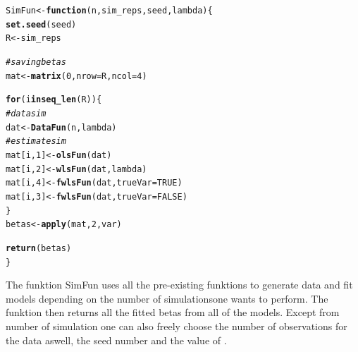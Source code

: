 \documentclass{article}\usepackage[]{graphicx}\usepackage[]{color}
\makeatletter
\newcommand{\hlnum}[1]{\textcolor[rgb]{0.686,0.059,0.569}{#1}}%
\newcommand{\hlcom}[1]{\textcolor[rgb]{0.678,0.584,0.686}{\textit{#1}}}%
\newcommand{\hlstd}[1]{\textcolor[rgb]{0.345,0.345,0.345}{#1}}%
\newcommand{\hlkwa}[1]{\textcolor[rgb]{0.161,0.373,0.58}{\textbf{#1}}}%
\newcommand{\hlkwb}[1]{\textcolor[rgb]{0.69,0.353,0.396}{#1}}%
\newcommand{\hlkwc}[1]{\textcolor[rgb]{0.333,0.667,0.333}{#1}}%
\newcommand{\hlkwd}[1]{\textcolor[rgb]{0.737,0.353,0.396}{\textbf{#1}}}%
\newenvironment{kframe}{%
 \def\at@end@of@kframe{}%
 \ifinner\ifhmode%
  \def\at@end@of@kframe{\end{minipage}}%
  \begin{minipage}{\columnwidth}%
 \fi\fi%
 \def\FrameCommand##1{\hskip\@totalleftmargin \hskip-\fboxsep
 \colorbox{shadecolor}{##1}\hskip-\fboxsep
     \hskip-\linewidth \hskip-\@totalleftmargin \hskip\columnwidth}%
 \MakeFramed {\advance\hsize-\width
   \@totalleftmargin\z@ \linewidth\hsize
   \@setminipage}}%
 {\par\unskip\endMakeFramed%
 \at@end@of@kframe}
\newenvironment{knitrout}{}{} %
\makeatother
\begin{document}
\begin{knitrout}
\color{fgcolor}\begin{kframe}
\begin{alltt}
\hlstd{SimFun} \hlkwb{<-} \hlkwa{function}\hlstd{(}\hlkwc{n}\hlstd{,} \hlkwc{sim_reps}\hlstd{,} \hlkwc{seed}\hlstd{,} \hlkwc{lambda}\hlstd{) \{}
    \hlkwd{set.seed}\hlstd{(seed)}
    \hlstd{R} \hlkwb{<-} \hlstd{sim_reps}

    \hlcom{# saving betas}
    \hlstd{mat} \hlkwb{<-} \hlkwd{matrix}\hlstd{(}\hlnum{0}\hlstd{,} \hlkwc{nrow} \hlstd{= R,} \hlkwc{ncol} \hlstd{=} \hlnum{4}\hlstd{)}

    \hlkwa{for} \hlstd{(i} \hlkwa{in} \hlkwd{seq_len}\hlstd{(R)) \{}
    \hlcom{# data sim}
    \hlstd{dat} \hlkwb{<-} \hlkwd{DataFun}\hlstd{(n, lambda)}
    \hlcom{# estimate sim}
    \hlstd{mat[i,}\hlnum{1}\hlstd{]} \hlkwb{<-} \hlkwd{olsFun}\hlstd{(dat)}
    \hlstd{mat[i,}\hlnum{2}\hlstd{]} \hlkwb{<-} \hlkwd{wlsFun}\hlstd{(dat, lambda)}
    \hlstd{mat[i,}\hlnum{4}\hlstd{]}\hlkwb{<-} \hlkwd{fwlsFun}\hlstd{(dat,} \hlkwc{trueVar} \hlstd{=} \hlnum{TRUE}\hlstd{)}
    \hlstd{mat[i,}\hlnum{3}\hlstd{]}\hlkwb{<-} \hlkwd{fwlsFun}\hlstd{(dat,} \hlkwc{trueVar} \hlstd{=} \hlnum{FALSE}\hlstd{)}
    \hlstd{\}}
    \hlstd{betas} \hlkwb{<-} \hlkwd{apply}\hlstd{(mat,} \hlnum{2}\hlstd{, var)}

    \hlkwd{return}\hlstd{(betas)}
\hlstd{\}}
\end{alltt}
\end{kframe}
\end{knitrout}

The funktion SimFun uses all the pre-existing funktions to generate data and fit models depending on the number of simulationsone wants to perform. The funktion then returns all the fitted betas from all of the models. Except from number of simulation one can also freely choose the number of observations for the data aswell, the seed number and the value of \lambda. 
\end{document}
